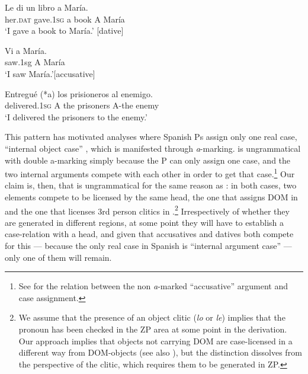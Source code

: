 \documentclass[output=paper,modfonts,nonflat,newtxmath,colorlinks,citecolor=brown]{langsci/langscibook}
\begin{document}
\ea%
    \label{ex:cabre:19}
      \ea
    \gll Le di un libro a María.\\
    {her.\textsc{dat}}   gave.\textsc{1sg}   a {book} {A} {María} \\
    \glt ‘I gave a book to María.’ \hfill [dative]

    \ex
    \gll Vi a María.\\
    {saw.1sg} {A} {María}\\
    \glt  ‘I saw María.’\hfill [accusative]
    \z
    \z

\ea%
    \label{ex:cabre:20}
    \gll Entregué (*a) los prisioneros al enemigo.\\
        delivered.\textsc{1sg} A  the prisoners  A-the  enemy\\
    \glt ‘I delivered the prisoners to the enemy.’
    \z

This pattern has motivated analyses where Spanish \liv Ps assign only one real case, ``internal object case'' \citep{Romero2012, OrmazabalRomero2013Probus}, which is manifested through \textit{a}{}-marking.  is ungrammatical with double a-marking simply because the \liv P can only assign one case, and the two internal arguments compete with each other in order to get that case.\footnote{See \citet{Romero2012} for the relation between the non \textit{a}{}-marked ``accusative'' argument and case assignment.}  Our claim is, then, that  is ungrammatical for the same reason as : in both cases, two elements compete to be licensed by the same head, the one that assigns DOM in  and the one that licenses 3rd person clitics in .\footnote{We assume that the presence of an object clitic (\textit{lo} or \textit{le}) implies that the pronoun has been checked in the ZP area at some point in the derivation. Our approach implies that objects not carrying DOM are case-licensed in a different way from DOM-objects (see also \citealt{López2012}), but the distinction dissolves from the perspective of the clitic, which requires them to be generated in ZP.} Irrespectively of whether they are generated in different regions, at some point they will have to establish a case-relation with a head, and given that accusatives and datives both compete for this — because the only real case in Spanish is ``internal argument case'' — only one of them will remain.

    \z
\end{document}
